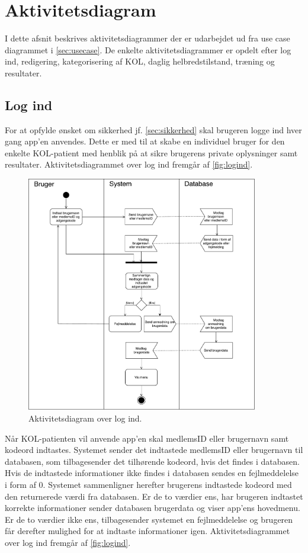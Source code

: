 \section{Aktivitetsdiagram}
I dette afsnit beskrives aktivitetsdiagrammer der er udarbejdet ud fra use case diagrammet i \autoref{sec:usecase}. De enkelte aktivitetsdiagrammer er opdelt efter log ind, redigering, kategorisering af KOL, daglig helbredstilstand, træning og resultater.    

\subsection{Log ind}
For at opfylde ønsket om sikkerhed jf. \autoref{sec:sikkerhed}  skal brugeren logge ind hver gang app'en anvendes. Dette er med til at skabe en individuel bruger for den enkelte KOL-patient med henblik på at sikre brugerens private oplysninger samt resultater. Aktivitetsdiagrammet over log ind fremgår af \autoref{fig:logind}. 


\begin{figure} [H]
\centering
\includegraphics[width=0.9\textwidth]{figures/aktivitetsdiagram/Logind}
\caption{Aktivitetsdiagram over log ind.}
\label{fig:logind}
\end{figure}

\noindent
Når KOL-patienten vil anvende app'en skal medlemsID eller brugernavn samt kodeord indtastes. Systemet sender det indtastede medlemsID eller brugernavn til databasen, som tilbagesender det tilhørende kodeord, hvis det findes i databasen. Hvis de indtastede informationer ikke findes i databasen sendes en fejlmeddelelse i form af 0. Systemet sammenligner herefter brugerens indtastede kodeord med den returnerede værdi fra databasen. Er de to værdier ens, har brugeren indtastet korrekte informationer sender databasen brugerdata og viser app'ens hovedmenu. Er de to værdier ikke ens, tilbagesender systemet en fejlmeddelelse og brugeren får derefter mulighed for at indtaste informationer igen. Aktivitetsdiagrammet over log ind fremgår af \autoref{fig:logind}.





